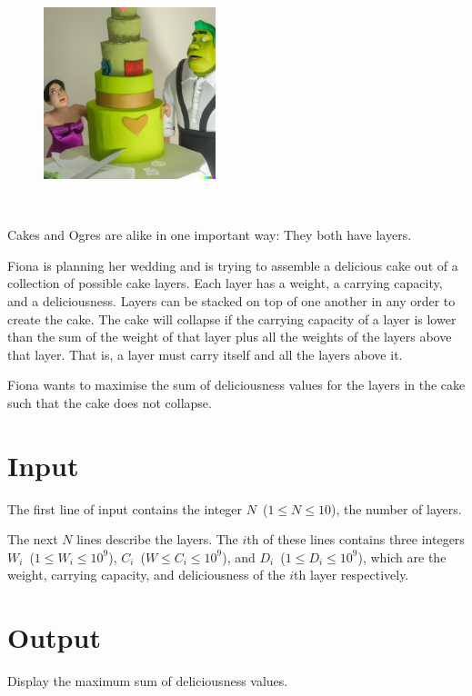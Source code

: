 
\begin{figure}
 \includegraphics[width=50mm]{img.png}
\end{figure}
~

Cakes and Ogres are alike in one important way: They both have layers.

Fiona is planning her wedding and is trying to assemble a delicious cake out of a collection of possible cake layers. Each layer has a weight, a carrying capacity, and a deliciousness. Layers can be stacked on top of one another in any order to create the cake. The cake will collapse if the carrying capacity of a layer is lower than the sum of the weight of that layer plus all the weights of the layers above that layer. That is, a layer must carry itself and all the layers above it.

Fiona wants to maximise the sum of deliciousness values for the layers in the cake such that the cake does not collapse.


\section*{Input}

The first line of input contains the integer $N$~($1 \leq N \leq 10$), the number of layers.

The next $N$ lines describe the layers. The $i$th of these lines contains three integers $W_i$~($1 \leq W_i \leq 10^9$), $C_i$~($W \leq C_i \leq 10^9$), and $D_i$~($1 \leq D_i \leq 10^9$), which are the weight, carrying capacity, and deliciousness of the $i$th layer respectively.


\section*{Output}

Display the maximum sum of deliciousness values.

